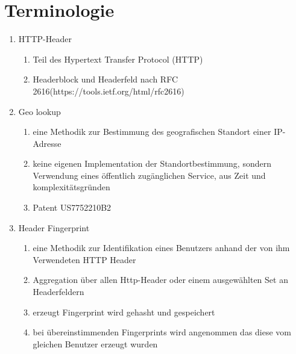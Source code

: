 \documentclass[
    fontsize=12pt,
    headings=small,
    parskip=half,           %
    bibliography=totoc,
    numbers=noenddot,       %
    open=any,               %
    ]{scrreprt}
\begin{document}
\newpage
\section{Terminologie}
\begin{enumerate}
\item HTTP-Header
\begin{enumerate}
\item Teil des Hypertext Transfer Protocol (HTTP)
\item Headerblock und Headerfeld nach RFC 2616(https://tools.ietf.org/html/rfc2616)
\end{enumerate}
\item Geo lookup
\begin{enumerate}
\item eine Methodik zur Bestimmung des geografischen Standort einer IP-Adresse
\item keine eigenen Implementation der Standortbestimmung, sondern Verwendung eines öffentlich zugänglichen Service, aus Zeit und komplexitätsgründen
\item Patent US7752210B2
\end{enumerate}
\item Header Fingerprint
\begin{enumerate}
\item eine Methodik zur Identifikation eines Benutzers anhand der von ihm Verwendeten HTTP Header
\item Aggregation über allen Http-Header oder einem ausgewählten Set an Headerfeldern 
\item erzeugt Fingerprint wird gehasht und gespeichert
\item bei übereinstimmenden Fingerprints wird angenommen das diese vom gleichen Benutzer erzeugt wurden 
\end{enumerate}
\end{enumerate}
\end{document}
